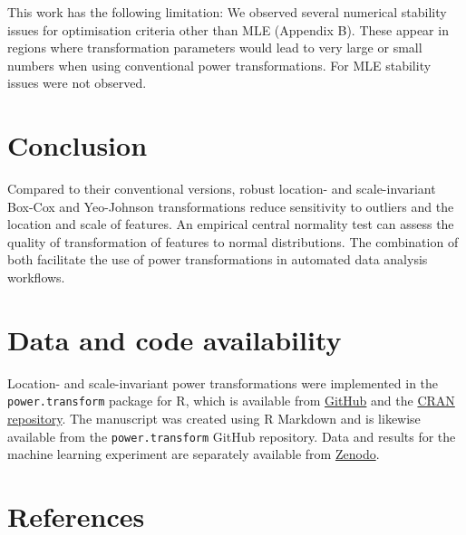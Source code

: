 \documentclass[
  a4paper,
]{article}
\begin{document}
This work has the following limitation: We observed several numerical
stability issues for optimisation criteria other than MLE (Appendix B).
These appear in regions where transformation parameters would lead to
very large or small numbers when using conventional power
transformations. For MLE stability issues were not observed.

\section{Conclusion}\label{conclusion}

Compared to their conventional versions, robust location- and
scale-invariant Box-Cox and Yeo-Johnson transformations reduce
sensitivity to outliers and the location and scale of features. An
empirical central normality test can assess the quality of
transformation of features to normal distributions. The combination of
both facilitate the use of power transformations in automated data
analysis workflows.

\section{Data and code availability}\label{data-and-code-availability}

Location- and scale-invariant power transformations were implemented in
the \texttt{power.transform} package for R, which is available from
\href{https://github.com/oncoray/power.transform}{GitHub} and the
\href{https://cran.r-project.org/package=power.transform}{CRAN
repository}. The manuscript was created using R Markdown and is likewise
available from the \texttt{power.transform} GitHub repository. Data and
results for the machine learning experiment are separately available
from \href{https://doi.org/10.5281/zenodo.14986689}{Zenodo}.

\section*{References}\label{references}
\end{document}
